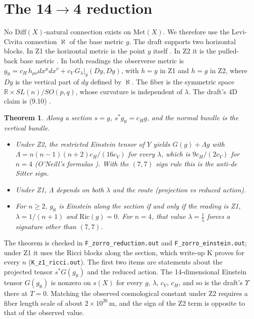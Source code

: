 \documentclass[11pt]{article}
\newtheorem{theorem}{Theorem}
\theoremstyle{remark}
\newcommand{\Met}{\mathrm{Met}}
\begin{document}
\section{The 14$\to$4 reduction}
No $\mathrm{Diff}(X)$-natural connection exists on $\Met(X)$. We therefore use the Levi-Civita connection $\aleph$ of the base metric $g$. The draft supports two horizontal blocks. In Z1 the horizontal metric is the point $y$ itself \cite[(3.7), (3.15), p.~36, p.~56]{W21}. In Z2 it is the pulled-back base metric \cite[\S3.5, p.~22]{W21}. In both readings the observerse metric is $g_\aleph=c_H\,h_{\mu\nu}dx^\mu dx^\nu+c_V\,G_\lambda|_y(Dy,Dy)$, with $h=y$ in Z1 and $h=g$ in Z2, where $Dy$ is the vertical part of $dy$ defined by $\aleph$. The fiber is the symmetric space $\mathbb R\times SL(n)/SO(p,q)$, whose curvature is independent of $\lambda$. The draft's 4D claim is (9.10) \cite[p.~45]{W21}.
\begin{theorem}
Along a section $s=g$, $s^*g_\aleph=c_Hg$, and the normal bundle is the vertical bundle.
\begin{itemize}
\item Under Z2, the restricted Einstein tensor of $Y$ yields $G(g)+\Lambda g$ with $\Lambda=n(n-1)(n+2)c_H/(16c_V)$ for every $\lambda$, which is $9c_H/(2c_V)$ for $n=4$ (O'Neill's formulas \cite{ON}). With the $(7,7)$ sign rule this is the anti-de Sitter sign.
\item Under Z1, $\Lambda$ depends on both $\lambda$ and the route (projection vs reduced action).
\item For $n\ge2$, $g_\aleph$ is Einstein along the section if and only if the reading is Z1, $\lambda=1/(n+1)$ and $\mathrm{Ric}(g)=0$. For $n=4$, that value $\lambda=\tfrac15$ forces a signature other than $(7,7)$.
\end{itemize}
\end{theorem}
The theorem is checked in \texttt{F\_zorro\_reduction.out} and \texttt{F\_zorro\_einstein.out}; under Z1 it uses the Ricci blocks along the section, which write-up K proves for every $n$ (\texttt{K\_z1\_ricci.out}). The first two items are statements about the projected tensor $s^*G(g_\aleph)$ and the reduced action. The 14-dimensional Einstein tensor $G(g_\aleph)$ is nonzero on $s(X)$ for every $g$, $\lambda$, $c_V$, $c_H$, and so is the draft's $\Upsilon$ there at $T=0$. Matching the observed cosmological constant under Z2 requires a fiber length scale of about $2\times10^{26}$\,m, and the sign of the Z2 term is opposite to that of the observed value.
\end{document}
